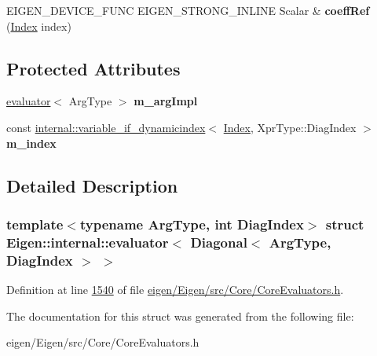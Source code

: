 \begin{DoxyCompactItemize}
\item 
\mbox{\label{struct_eigen_1_1internal_1_1evaluator_3_01_diagonal_3_01_arg_type_00_01_diag_index_01_4_01_4_ae9ab3ba6de1b89f0dfa3c28945e01f68}} 
E\+I\+G\+E\+N\+\_\+\+D\+E\+V\+I\+C\+E\+\_\+\+F\+U\+NC E\+I\+G\+E\+N\+\_\+\+S\+T\+R\+O\+N\+G\+\_\+\+I\+N\+L\+I\+NE Scalar \& {\bfseries coeff\+Ref} (\hyperlink{namespace_eigen_a62e77e0933482dafde8fe197d9a2cfde}{Index} index)
\end{DoxyCompactItemize}
\subsection*{Protected Attributes}
\begin{DoxyCompactItemize}
\item 
\mbox{\label{struct_eigen_1_1internal_1_1evaluator_3_01_diagonal_3_01_arg_type_00_01_diag_index_01_4_01_4_a8cde4e51cf5ae2683af975c1c9a3bd11}} 
\hyperlink{struct_eigen_1_1internal_1_1evaluator}{evaluator}$<$ Arg\+Type $>$ {\bfseries m\+\_\+arg\+Impl}
\item 
\mbox{\label{struct_eigen_1_1internal_1_1evaluator_3_01_diagonal_3_01_arg_type_00_01_diag_index_01_4_01_4_a2f8e3292e7c299d3215604435bf001c0}} 
const \hyperlink{class_eigen_1_1internal_1_1variable__if__dynamicindex}{internal\+::variable\+\_\+if\+\_\+dynamicindex}$<$ \hyperlink{namespace_eigen_a62e77e0933482dafde8fe197d9a2cfde}{Index}, Xpr\+Type\+::\+Diag\+Index $>$ {\bfseries m\+\_\+index}
\end{DoxyCompactItemize}


\subsection{Detailed Description}
\subsubsection*{template$<$typename Arg\+Type, int Diag\+Index$>$\newline
struct Eigen\+::internal\+::evaluator$<$ Diagonal$<$ Arg\+Type, Diag\+Index $>$ $>$}



Definition at line \hyperlink{eigen_2_eigen_2src_2_core_2_core_evaluators_8h_source_l01540}{1540} of file \hyperlink{eigen_2_eigen_2src_2_core_2_core_evaluators_8h_source}{eigen/\+Eigen/src/\+Core/\+Core\+Evaluators.\+h}.



The documentation for this struct was generated from the following file\+:\begin{DoxyCompactItemize}
\item 
eigen/\+Eigen/src/\+Core/\+Core\+Evaluators.\+h\end{DoxyCompactItemize}
